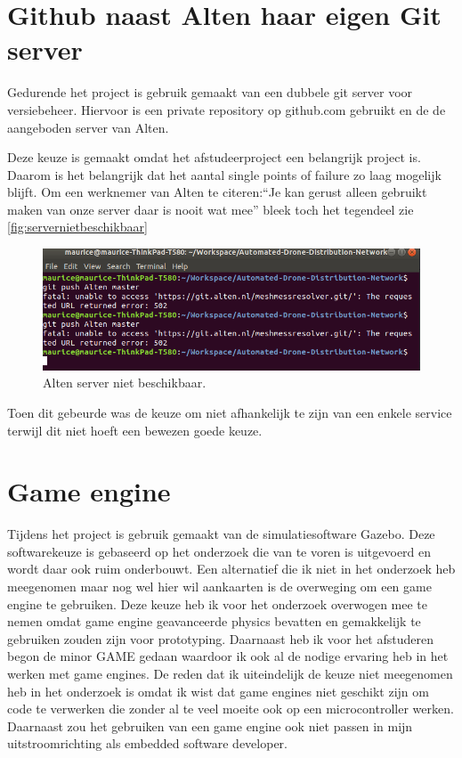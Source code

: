 \documentclass[a4paper, 11pt, oneside]{report}
\begin{document}
\section{Github naast Alten haar eigen Git server}

Gedurende het project is gebruik gemaakt van een dubbele git server voor versiebeheer.
Hiervoor is een private repository op github.com gebruikt en de de aangeboden server van Alten.

Deze keuze is gemaakt omdat het afstudeerproject een belangrijk project is. 
Daarom is het belangrijk dat het aantal single points of failure zo laag mogelijk blijft.
Om een werknemer van Alten te citeren:``Je kan gerust alleen gebruikt maken van onze server daar is nooit wat mee'' bleek toch het tegendeel zie \autoref{fig:servernietbeschikbaar}

\begin{figure}[H]
	\begin{center}\includegraphics[width=0.61\linewidth]{Afbeeldingen/AltenGit.png}\end{center}
	\caption{Alten server niet beschikbaar.}
	\label{fig:servernietbeschikbaar}
\end{figure}

Toen dit gebeurde was de keuze om niet afhankelijk te zijn van een enkele service terwijl dit niet hoeft een bewezen goede keuze.

\section{Game engine}

Tijdens het project is gebruik gemaakt van de simulatiesoftware Gazebo. Deze softwarekeuze is gebaseerd op het onderzoek die van te voren is uitgevoerd en wordt daar ook ruim onderbouwt. Een alternatief die ik niet in het onderzoek heb meegenomen maar nog wel hier wil aankaarten is de overweging om een game engine te gebruiken. Deze keuze heb ik voor het onderzoek overwogen mee te nemen omdat game engine geavanceerde physics bevatten en gemakkelijk te gebruiken zouden zijn voor prototyping. Daarnaast heb ik voor het afstuderen begon de minor GAME gedaan waardoor ik ook al de nodige ervaring heb in het werken met game engines. De reden dat ik uiteindelijk de keuze niet meegenomen heb in het onderzoek is omdat ik wist dat game engines niet geschikt zijn om code te verwerken die zonder al te veel moeite ook op een microcontroller werken. Daarnaast zou het gebruiken van een game engine ook niet passen in mijn uitstroomrichting als embedded software developer.
\end{document}
